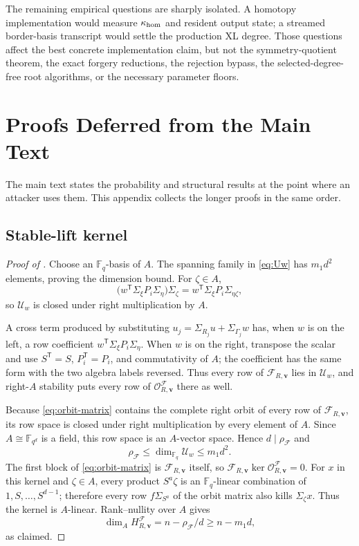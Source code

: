 \documentclass[11pt]{article}
\newcommand{\F}{\mathbb F}
\newcommand{\transpose}{\mathsf T}
\begin{document}
The remaining empirical questions are sharply isolated.  A homotopy
implementation would measure $\kappa_{\rm hom}$ and resident output state; a
streamed border-basis transcript would settle the production XL degree.  Those
questions affect the best concrete implementation claim, but not the
symmetry-quotient theorem, the exact forgery reductions, the rejection bypass,
the selected-degree-free root algorithms, or the necessary parameter floors.

\appendix
\setcounter{section}{0}
\renewcommand{\thesection}{\Alph{section}}
\renewcommand{\theHsection}{app.\Alph{section}}


\section{Proofs Deferred from the Main Text}\label{app:deferred-proofs}

The main text states the probability and structural results at the point where
an attacker uses them.  This appendix collects the longer proofs in the same
order.

\subsection{Stable-lift kernel}\label{app:proof-stable-kernel}

\begin{proof}[Proof of ]
Choose an $\F_q$-basis of $A$.  The spanning family in \eqref{eq:Uw} has
$m_1d^2$ elements, proving the dimension bound.  For $\zeta\in A$,
\[
 \bigl(w^\transpose\Sigma_\xi P_i\Sigma_\eta\bigr)\Sigma_\zeta
 =w^\transpose\Sigma_\xi P_i\Sigma_{\eta\zeta},
\]
so $\mathcal U_w$ is closed under right multiplication by $A$.

A cross term produced by substituting
$u_j=\Sigma_{R_j}u+\Sigma_{\Gamma_j}w$ has, when $w$ is on the left, a row
coefficient $w^\transpose\Sigma_\xi P_i\Sigma_\eta$.  When $w$ is on the
right, transpose the scalar and use $S^\transpose=S$,
$P_i^\transpose=P_i$, and commutativity of $A$; the coefficient has the same
form with the two algebra labels reversed.  Thus every row of
$\mathcal F_{R,\mathbf v}$ lies in $\mathcal U_w$, and right-$A$ stability
puts every row of $\mathcal O^{\mathcal F}_{R,\mathbf v}$ there as well.

Because \eqref{eq:orbit-matrix} contains the complete right orbit of every row
of $\mathcal F_{R,\mathbf v}$, its row space is closed under right
multiplication by every element of $A$.  Since $A\cong\F_{q^d}$ is a field,
this row space is an $A$-vector space.  Hence $d\mid\rho_{\mathcal F}$ and
\[
 \rho_{\mathcal F}\le\dim_{\F_q}\mathcal U_w\le m_1d^2.
\]
The first block of \eqref{eq:orbit-matrix} is
$\mathcal F_{R,\mathbf v}$ itself, so
$\mathcal F_{R,\mathbf v}\ker\mathcal O^{\mathcal F}_{R,\mathbf v}=0$.
For $x$ in this kernel and $\zeta\in A$, every product $S^a\zeta$ is an
$\F_q$-linear combination of $1,S,\ldots,S^{d-1}$; therefore every row
$ f\Sigma_{S^a}$ of the orbit matrix also kills $\Sigma_\zeta x$.  Thus the
kernel is $A$-linear.  Rank--nullity over $A$ gives
\[
 \dim_A H^{\mathcal F}_{R,\mathbf v}
 =n-\rho_{\mathcal F}/d\ge n-m_1d,
\]
as claimed.
\end{proof}
\end{document}
